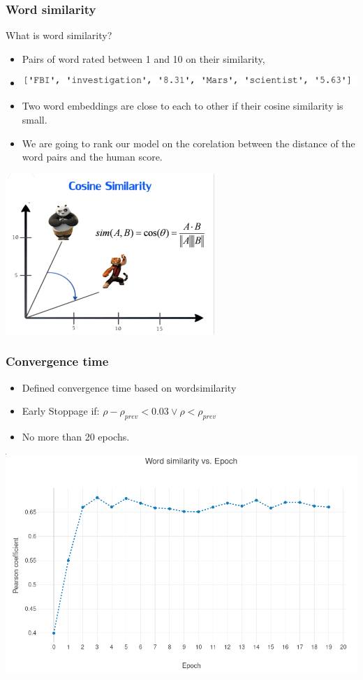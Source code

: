\begin{frame}
\frametitle{Word similarity}
\begin{Large}
What is word similarity? 
\end{Large}
\medskip
\begin{itemize}
\item Pairs of word rated between 1 and 10 on their similarity, 
\item \includegraphics[scale=0.5]{images/wordsim353_example}
\item Two word embeddings are close to each to other if their cosine similarity is small. 
\item We are going to rank our model on the corelation between the distance of the word pairs and the human score.
\end{itemize}
\centerline{ \includegraphics[scale=0.4]{images/cosine}}
\end{frame}
\begin{frame}
\frametitle{Convergence time}
\begin{itemize}
\item Defined convergence time based on wordsimilarity
\item Early Stoppage if: $ \rho -  \rho_{prev} < 0.03 \vee \rho < \rho_{prev}$ 
\item No more than 20 epochs. 
\end{itemize}
\includegraphics[scale=0.3]{images/wordsim_convergence}
\end{frame}
